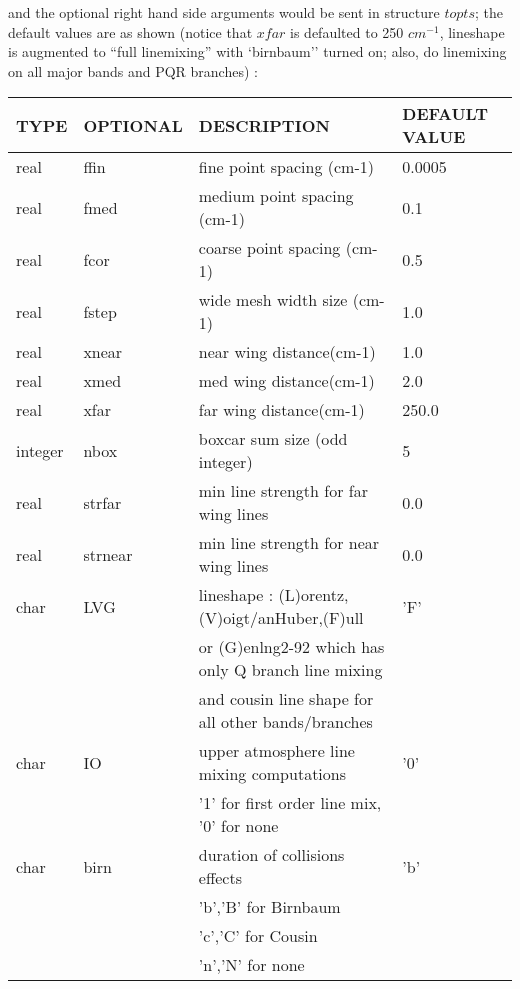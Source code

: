 \documentclass[11pt]{article}
\begin{document}
and the optional right hand side arguments would be sent in structure $topts$;
the default values are as shown (notice that $xfar$ is defaulted to 
250 $cm^{-1}$, lineshape is augmented to ``full linemixing'' with `birnbaum''
turned on; also, do linemixing on all major bands and PQR branches) : 
\begin{longtable}{llll}
\hline
\hline
  TYPE  &   OPTIONAL &         DESCRIPTION  &            DEFAULT VALUE\\
\hline
\hline
real   &  ffin    &      fine point spacing (cm-1)    &   0.0005\\
real   &  fmed    &      medium point spacing (cm-1)  &   0.1\\
real   &  fcor    &      coarse point spacing (cm-1)  &   0.5\\
\hline
real   &  fstep   &      wide mesh width size (cm-1) &    1.0\\
real   &  xnear   &      near wing distance(cm-1)    &    1.0\\
real   &  xmed    &      med wing distance(cm-1)     &    2.0\\
real   &  xfar    &      far wing distance(cm-1)     &    250.0\\
\hline
integer & nbox     &     boxcar sum size (odd integer) &  5\\
\hline
real   &  strfar   &    min line strength for far wing lines  & 0.0\\
real   &  strnear  &    min line strength for near wing lines & 0.0\\
\hline
char   &  LVG       &    lineshape : (L)orentz,(V)oigt/anHuber,(F)ull  & 'F' \\
       &         &  or (G)enlng2-92 which has only Q branch line mixing & \\
       &         &  and cousin line shape for all other bands/branches & \\
char   &  IO        &    upper atmosphere line mixing computations     & '0' \\
       &            &    '1' for first order line mix, '0' for none    &     \\
char   &  birn      &    duration of collisions effects                & 'b' \\
       &            &    'b','B' for Birnbaum                          &     \\
       &            &    'c','C' for Cousin                            &     \\
       &            &    'n','N' for none                              &     \\

\end{longtable}
\end{document}
